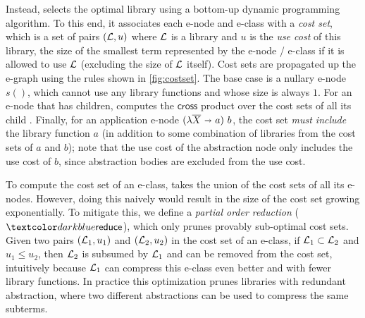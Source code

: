 %
Instead, \tool selects the optimal library using a bottom-up dynamic programming algorithm.
%
To this end, it associates each e-node and e-class with a \emph{cost set},
which is a set of pairs $(\mathcal{L}, u)$
  where $\mathcal{L}$ is a library and $u$ is the \emph{use cost} of this library,
  \ie the size of the smallest term represented by the e-node / e-class if it is allowed to use $\mathcal{L}$
  (excluding the size of $\mathcal{L}$ itself).
%
Cost sets are propagated up the e-graph using the rules shown in \autoref{fig:costset}.
%
The base case is a nullary e-node $s()$,
  which cannot use any library functions and whose size is always $1$.
%
For an e-node that has children,
\babble computes the $\mathsf{cross}$ product over the cost sets of all its child \eclasses.
%
Finally, for an application e-node $(\lambda \many{X} \bnd a)\ b$,
  the cost set \emph{must include} the library function $a$
  (in addition to some combination of libraries from the cost sets of $a$ and $b$);
  note that the use cost of the abstraction node only includes the use cost of $b$,
  since abstraction bodies are excluded from the use cost.

To compute the cost set of an e-class,
  \babble takes the union of the cost sets of all its e-nodes.
%
However, doing this naively would result in the size of the cost set growing exponentially.
%
To mitigate this, we define a \emph{partial order reduction} ($\sfunify$),
which only prunes provably sub-optimal cost sets.
%
Given two pairs $(\mathcal{L}_1, u_1)$ and $(\mathcal{L}_2, u_2)$ in the cost set of an e-class, 
if $\mathcal{L}_1 \subset \mathcal{L}_2$ and $u_1 \leq u_2$, 
then $\mathcal{L}_2$ is subsumed by $\mathcal{L}_1$ and can be removed from the cost set,
intuitively because $\mathcal{L}_1$ can compress this e-class even better and with fewer library functions.
%
In practice this optimization prunes libraries with redundant abstraction,
where two different abstractions can be used to compress the same subterms.



